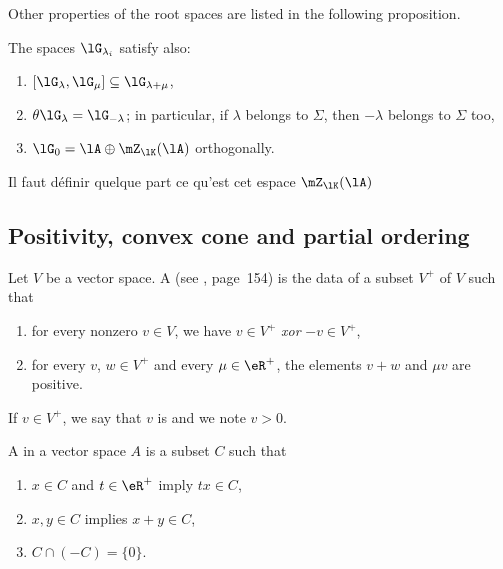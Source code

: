 Other properties of the root spaces are listed in the following proposition.
\begin{proposition}
The spaces $\lG_{\lambda_i}$ satisfy also:
\begin{enumerate}
\item $[\lG_{\lambda},\lG_{\mu}]\subseteq\lG_{\lambda+\mu}$,
\item $\theta\lG_{\lambda}=\lG_{-\lambda}$; in particular, if $\lambda$ belongs to $\Sigma$, then $-\lambda$ belongs to $\Sigma$ too,
\item $\lG_0=\lA\oplus\mZ_{\lK}(\lA)$ orthogonally.
\end{enumerate}
\end{proposition}

\begin{probleme}
Il faut définir quelque part ce qu'est cet espace $\mZ_{\lK}(\lA)$
\end{probleme}

\subsection{Positivity, convex cone and partial ordering}
\label{SubsecPosiCconePartOrder}

\begin{definition}
    Let $V$ be a vector space. A  (see \cite{Knapp}, page~154) is the data of a subset $V^+$ of $V$ such that
    \begin{enumerate}
        \item
            for every nonzero $v\in V$, we have $v\in V^+$ \emph{xor} $-v\in V^+$,
        \item 
            for every $v$, $w\in V^+$ and every $\mu\in\eR^+$, the elements $v+w$ and $\mu v$ are positive.
    \end{enumerate}
\end{definition}

If $v\in V^+$, we say that $v$ is  and we note $v>0$. 

\begin{definition}      \label{DefConvexCone}
    A  in a vector space \(A\) is a subset $C$ such that
    \begin{enumerate}
        \item
            $x\in C$ and $t\in\eR^+$ imply $tx\in C$, \label{enuli}
        \item
            $x,y\in C$ implies $x+y\in C$,\label{enulii}
        \item
            $C\cap(-C)=\{ 0 \}$.\label{enuliii}
    \end{enumerate}
\end{definition}

